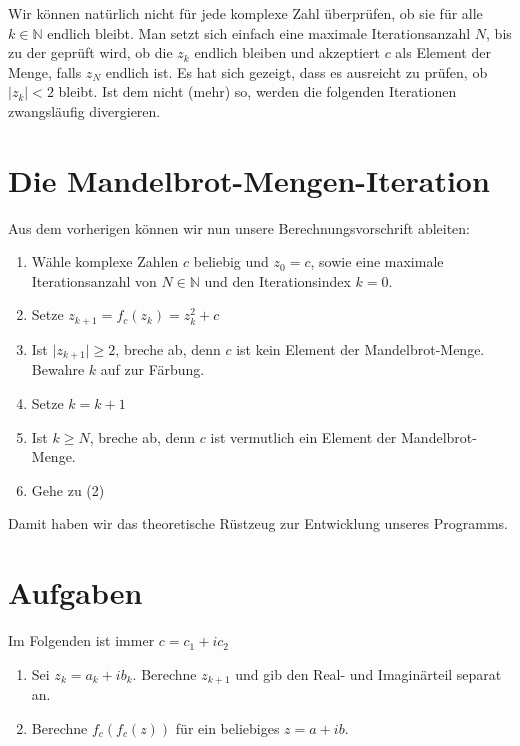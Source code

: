 Wir können natürlich nicht für jede komplexe Zahl überprüfen, ob sie für alle $k\in \mathbb{N}$ endlich bleibt. Man setzt sich einfach eine maximale Iterationsanzahl $N$, bis zu der geprüft wird, ob die $z_k$ endlich bleiben und akzeptiert $c$ als Element der Menge, falls $z_N$ endlich ist. Es hat sich gezeigt, dass es ausreicht zu prüfen, ob $\vert z_k\vert <2$ bleibt. Ist dem nicht (mehr) so, werden die folgenden Iterationen zwangsläufig divergieren. 

\section{Die Mandelbrot-Mengen-Iteration}

Aus dem vorherigen können wir nun unsere Berechnungsvorschrift ableiten:

\begin{enumerate}
\item Wähle komplexe Zahlen $c$ beliebig und $z_0=c$, sowie eine maximale Iterationsanzahl von $N\in \mathbb{N}$ und den Iterationsindex $k=0$.
\item Setze $z_{k+1} = f_c(z_k) = z_k^2 +c$
\item Ist $\vert z_{k+1} \vert \ge 2$, breche ab, denn $c$ ist kein Element der Mandelbrot-Menge. Bewahre $k$ auf zur Färbung.
\item Setze $k = k+1$
\item Ist $k\ge N$, breche ab, denn $c$ ist vermutlich ein Element der Mandelbrot-Menge. 
\item Gehe zu (2)
\end{enumerate}

Damit haben wir das theoretische Rüstzeug zur Entwicklung unseres Programms.

\section{Aufgaben}
Im Folgenden ist immer $c=c_1+ic_2$
\begin{enumerate}
\item Sei $z_k = a_k+ib_k$. Berechne $z_{k+1}$ und gib den Real- und Imaginärteil separat an. 
\item Berechne $f_c\left( f_c(z)\right)$ für ein beliebiges $z = a+ib$.
\end{enumerate}

